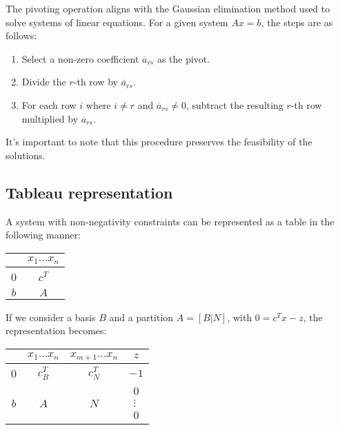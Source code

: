 The pivoting operation aligns with the Gaussian elimination method used to solve systems of linear equations. 
For a given system $Ax=b$, the steps are as follows:
\begin{enumerate}
    \item Select a non-zero coefficient $\overline{a}_{rs}$ as the pivot.
    \item Divide the $r$-th row by $\overline{a}_{rs}$. 
    \item For each row $i$ where $i \neq r$ and $\overline{a}_{rs} \neq 0$, subtract the resulting $r$-th row multiplied by $\overline{a}_{rs}$. 
\end{enumerate}
It's important to note that this procedure preserves the feasibility of the solutions.

\subsection*{Tableau representation}
A system with non-negativity constraints can be represented as a table in the following manner:
\begin{table}[H]
    \centering
    \begin{tabular}{cc}
                              & $x_1 \dots x_n$            \\ \hline
    \multicolumn{1}{|c|}{0}   & \multicolumn{1}{c|}{$c^T$} \\ \hline
    \multicolumn{1}{|c|}{$b$} & \multicolumn{1}{c|}{$A$}   \\ \hline
    \end{tabular}
\end{table}
If we consider a basis $B$ and a partition $A=\left[B|N\right]$, with $0=c^Tx-z$, the representation becomes:
\begin{table}[H]
    \centering
    \begin{tabular}{cccc}
                              & $x_1 \dots x_n$              & $x_{m+1}\dots x_n$           & $z$                                                                                                                                                                      \\ \hline
    \multicolumn{1}{|c|}{0}   & \multicolumn{1}{c|}{$c^T_B$} & \multicolumn{1}{c|}{$c^T_N$} & \multicolumn{1}{c|}{$-1$}                                                                                                                                                \\ \hline
    \multicolumn{1}{|c|}{$b$} & \multicolumn{1}{c|}{$A$}     & \multicolumn{1}{c|}{$N$}     & \multicolumn{1}{c|}{$\begin{matrix}0\\\vdots\\0\end{matrix}$} \\ \hline
    \end{tabular}
\end{table}
